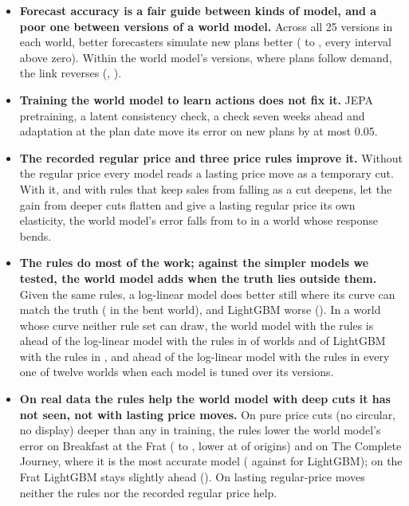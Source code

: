 \begin{itemize}\setlength{\itemsep}{1pt}
\item \textbf{Forecast accuracy is a fair guide between kinds of model, and a poor one between versions of a world
model.} Across all 25 versions in each world, better forecasters simulate new plans better (\linkAllMin{} to
\linkAllMax{}, every interval above zero). Within the world model's versions, where plans follow demand, the link
reverses (\linkBWmOne{}, \linkBWmOneCi{}).
\item \textbf{Training the world model to learn actions does not fix it.} JEPA pretraining, a latent consistency
check, a check seven weeks ahead and adaptation at the plan date move its error on new plans by at most 0.05.
\item \textbf{The recorded regular price and three price rules improve it.} Without the regular price every model reads
a lasting price move as a temporary cut. With it, and with rules that keep sales from falling as a cut deepens, let
the gain from deeper cuts flatten and give a lasting regular price its own elasticity, the world model's error falls
from \errBWm{} to \errBShape{} in a world whose response bends.
\item \textbf{The rules do most of the work; against the simpler models we tested, the world model adds when the
truth lies outside them.} Given the same
rules, a log-linear model does better still where its curve can match the truth (\errBLlShape{} in the bent world),
and LightGBM worse (\errBLgbShape{}). In a world whose curve neither rule set can draw, the world model with the rules
is ahead of the log-linear model with the rules in \hhBaseKWmLlWon{} of \hhBaseKWmLlN{} worlds and of LightGBM with
the rules in \hhBaseKWmLgbWon{}, and ahead of the log-linear model with the rules in every one of twelve worlds when
each model is tuned over its versions.
\item \textbf{On real data the rules help the world model with deep cuts it has not seen, not with lasting price
moves.} On pure price cuts (no circular, no display) deeper than any in training, the rules lower the world model's
error on Breakfast at the Frat (\reFPureWm{} to \reFPureWmShape{}, lower at \rpFPureWmShapeVWmWon{} of
\rpFPureWmShapeVWmOf{} origins) and on The Complete Journey, where it is the most accurate model (\reCPureWmShape{}
against \reCPureLgb{} for LightGBM); on the Frat LightGBM stays slightly ahead (\reFPureLgb{}). On lasting
regular-price moves neither the rules nor the recorded regular price help.
\end{itemize}

